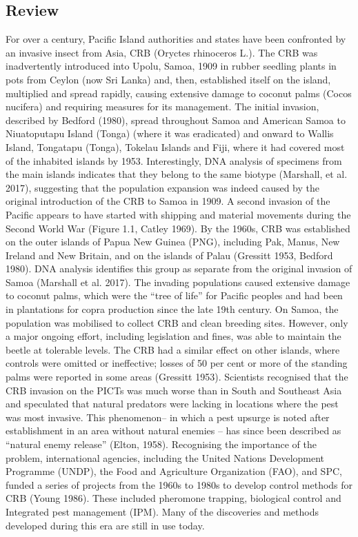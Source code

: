 \documentclass[twocolumn,letterpaper]{scrartcl}
\begin{document}
\subsection{Review}

For over a century, Pacific Island authorities and states have been confronted by an invasive insect from Asia, CRB 
(Oryctes rhinoceros L.). The CRB was inadvertently introduced into Upolu, Samoa, 1909 in rubber seedling plants 
in pots from Ceylon (now Sri Lanka) and, then, established itself on the island, multiplied and spread rapidly, 
causing extensive damage to coconut palms (Cocos nucifera) and requiring measures for its management. The 
initial invasion, described by Bedford (1980), spread throughout Samoa and American Samoa to Niuatoputapu 
Island (Tonga) (where it was eradicated) and onward to Wallis Island, Tongatapu (Tonga), Tokelau Islands and 
Fiji, where it had covered most of the inhabited islands by 1953. Interestingly, DNA analysis of specimens from 
the main islands indicates that they belong to the same biotype (Marshall, et al. 2017), suggesting that the 
population expansion was indeed caused by the original introduction of the CRB to Samoa in 1909. A second 
invasion  of  the  Pacific  appears  to  have  started  with  shipping  and  material  movements  during  the  Second 
World  War  (Figure  1.1,  Catley  1969).  By  the  1960s,  CRB  was  established  on  the  outer  islands  of  Papua  New 
Guinea (PNG), including Pak, Manus, New Ireland and New Britain, and on the islands of Palau (Gressitt 1953, 
Bedford 1980). DNA analysis identifies this group as separate from the original invasion of Samoa (Marshall et 
al. 2017). The invading populations caused extensive damage to coconut palms, which were the “tree of life” 
for Pacific peoples and had been in plantations for copra production since the late 19th century. On Samoa, 
the population was mobilised to collect CRB and clean breeding sites. However, only a major ongoing effort, 
including legislation and fines, was able to maintain the beetle at tolerable levels. The CRB had a similar effect 
on other islands, where controls were omitted or ineffective; losses of 50 per cent or more of the standing palms 
were reported in some areas (Gressitt 1953). Scientists recognised that the CRB invasion on the PICTs was much 
worse than in South and Southeast Asia and speculated that natural predators were lacking in locations where 
the pest was most invasive. This phenomenon– in which a pest upsurge is noted after establishment in an area 
without natural enemies – has since been described as “natural enemy release” (Elton, 1958). Recognising the 
importance of the problem, international agencies, including the United Nations Development Programme 
(UNDP),  the  Food  and  Agriculture  Organization  (FAO),  and  SPC,  funded  a  series  of  projects  from  the  1960s 
to 1980s to develop control methods for CRB (Young 1986). These included pheromone trapping, biological 
control and Integrated pest management (IPM). Many of the discoveries and methods developed during this 
era are still in use today. 
\end{document}

